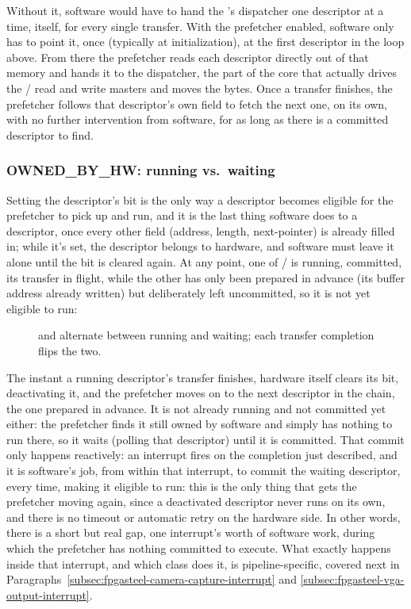 Without it, software would have to hand the 's dispatcher one descriptor at a time, itself, for every single transfer. With the prefetcher enabled, software only has to point it, once (typically at initialization), at the first descriptor in the loop above. From there the prefetcher reads each descriptor directly out of that memory and hands it to the dispatcher, the part of the  core that actually drives the / read and write masters and moves the bytes. Once a transfer finishes, the prefetcher follows that descriptor's own  field to fetch the next one, on its own, with no further intervention from software, for as long as there is a committed descriptor to find.

\subsubsection{OWNED\_BY\_HW: running vs.\ waiting}

Setting the descriptor's bit  is the only way a descriptor becomes eligible for the prefetcher to pick up and run, and it is the last thing software does to a descriptor, once every other field (address, length, next-pointer) is already filled in; while it's set, the descriptor belongs to hardware, and software must leave it alone until the bit is cleared again. At any point, one of / is running, committed, its transfer in flight, while the other has only been prepared in advance (its buffer address already written) but deliberately left uncommitted, so it is not yet eligible to run:

\begin{figure}[htbp]
    \centering
    
    \caption{ and  alternate between running and waiting; each transfer completion flips the two.}
    \label{fig:fpgasteel-descriptor-ping-pong}
\end{figure}

The instant a running descriptor's transfer finishes, hardware itself clears its  bit, deactivating it, and the prefetcher moves on to the next descriptor in the chain, the one prepared in advance. It is not already running and not committed yet either: the prefetcher finds it still owned by software and simply has nothing to run there, so it waits (polling that descriptor) until it is committed. That commit only happens reactively: an interrupt fires on the completion just described, and it is software's job, from within that interrupt, to commit the waiting descriptor, every time, making it eligible to run: this is the only thing that gets the prefetcher moving again, since a deactivated descriptor never runs on its own, and there is no timeout or automatic retry on the hardware side. In other words, there is a short but real gap, one interrupt's worth of software work, during which the prefetcher has nothing committed to execute. What exactly happens inside that interrupt, and which class does it, is pipeline-specific, covered next in Paragraphs~\ref{subsec:fpgasteel-camera-capture-interrupt} and \ref{subsec:fpgasteel-vga-output-interrupt}.

